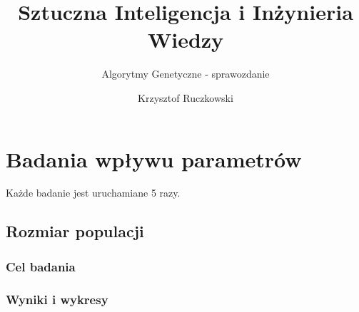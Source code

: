 \documentclass[12pt,a4paper]{article}
\author{Krzysztof Ruczkowski}
\title{Sztuczna Inteligencja i Inżynieria Wiedzy}
\subtitle{Algorytmy Genetyczne - sprawozdanie}
\begin{document}
\maketitle
\tableofcontents
\newpage

\section{Badania wpływu parametrów}
Każde badanie jest uruchamiane 5 razy.
\subsection{Rozmiar populacji}
\subsubsection{Cel badania}
\subsubsection{Wyniki i wykresy}
\end{document}
